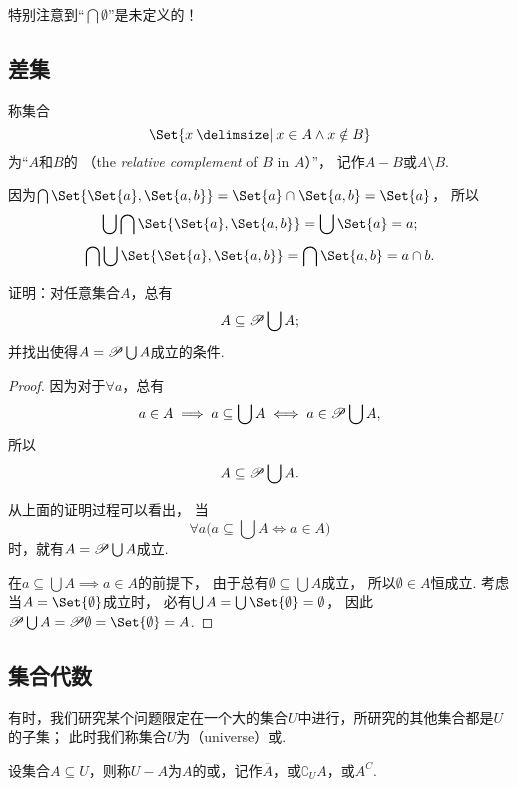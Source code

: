 特别注意到“\(\bigcap\emptyset\)”是未定义的！


\subsection{差集}
\begin{definition}
称集合\[
	\Set{ x \given x \in A \land x \notin B }
\]为“\(A\)和\(B\)的%
（the \emph{relative complement} of \(B\) in \(A\)）”，
记作\(A - B\)或\(A \setminus B\).
\end{definition}

\begin{example}
因为\(\bigcap\Set{ \Set{a}, \Set{a,b} } = \Set{a} \cap \Set{a,b} = \Set{a}\)，%
所以\[
\bigcup \bigcap \Set{ \Set{a}, \Set{a,b} } = \bigcup \Set{a} = a;
\]\[
\bigcap \bigcup \Set{ \Set{a}, \Set{a,b} } = \bigcap \Set{a,b} = a \cap b.
\]
\end{example}



\begin{example}
证明：对任意集合\(A\)，总有
\begin{equation}\label{equation:集合论.系的并的幂集包含系}
	A \subseteq \mathscr{P} \bigcup A;
\end{equation}
并找出使得\(A = \mathscr{P} \bigcup A\)成立的条件.
\begin{proof}
因为对于\(\forall a\)，总有\[
	a \in A
	\implies
	a \subseteq \bigcup A
	\iff
	a \in \mathscr{P} \bigcup A,
\]
所以\[
	A \subseteq \mathscr{P} \bigcup A.
\]

从上面的证明过程可以看出，
当\[
	\forall a \bigl( a \subseteq \bigcup A \iff a \in A \bigr)
\]时，就有\(A = \mathscr{P} \bigcup A\)成立.

在\(a \subseteq \bigcup A \implies a \in A\)的前提下，
由于总有\(\emptyset \subseteq \bigcup A\)成立，
所以\(\emptyset \in A\)恒成立.
考虑当\(A = \Set{\emptyset}\)成立时，
必有\(\bigcup A = \bigcup\Set{\emptyset} = \emptyset\)，
因此\(\Powerset \bigcup A = \Powerset \emptyset = \Set{\emptyset} = A\).
\end{proof}
\end{example}


\subsection{集合代数}
\begin{definition}[全集、补集]
有时，我们研究某个问题限定在一个大的集合\(U\)中进行，所研究的其他集合都是\(U\)的子集；
此时我们称集合\(U\)为（universe）或.

设集合\(A \subseteq U\)，则称\(U-A\)为\(A\)的或，记作\(\overline{A}\)，或\(\complement_U A\)，或\(A^C\).
\end{definition}

